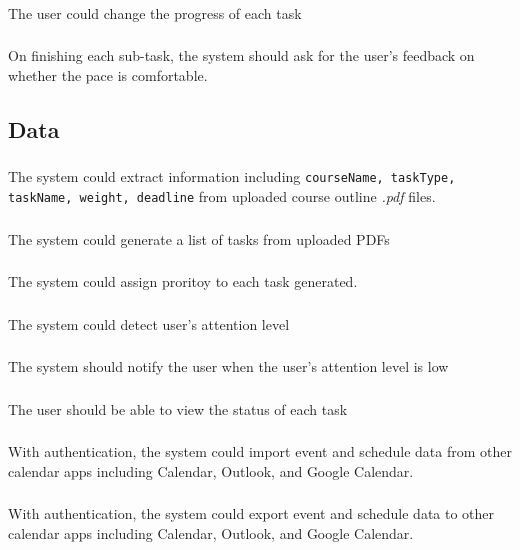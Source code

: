 \documentclass[12pt]{article}
\begin{document}
\subsubsection{}
The user could change the progress of each task
\subsubsection{}
On finishing each sub-task, the system should ask for the user's feedback on whether the pace is comfortable.


\subsection{Data}
\subsubsection{}
The system could extract information including \texttt{courseName, taskType, taskName, weight, deadline} from uploaded course outline \textit{.pdf} files.
\subsubsection{}
The system could generate a list of tasks from uploaded PDFs 
\subsubsection{}
The system could assign proritoy to each task generated.
\subsubsection{}
The system could detect user's attention level
\subsubsection{}
The system should notify the user when the user's attention level is low
\subsubsection{}
The user should be able to view the status of each task
\subsubsection{}
With authentication, the system could import event and schedule data from other calendar apps including Calendar, Outlook, and Google Calendar.
\subsubsection{}
With authentication, the system could export event and schedule data to other calendar apps including Calendar, Outlook, and Google Calendar.
\end{document}
